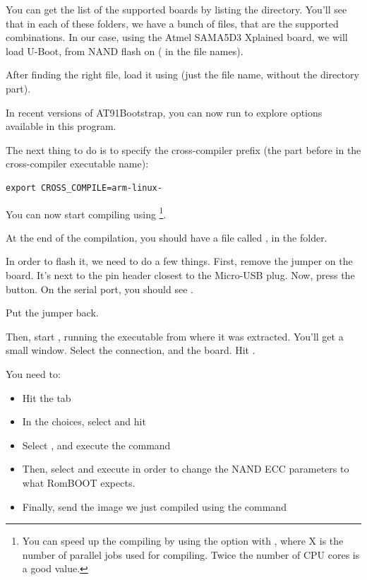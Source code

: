 You can get the list of the supported boards by listing the
 directory. You'll see that in each of these folders, we
have a bunch of  files, that are the supported
combinations. In our case, using the Atmel SAMA5D3 Xplained
board, we will load U-Boot, from NAND flash on
( in the  file names).

After finding the right  file, load it using
 (just the file name, without
the directory part).

In recent versions of AT91Bootstrap, you can now run  to explore options available in this program. 

The next thing to do is to specify the cross-compiler prefix
(the part before  in the cross-compiler executable name):

\begin{verbatim}
export CROSS_COMPILE=arm-linux-
\end{verbatim}

You can now start compiling using \footnote{You can
speed up the compiling by using the  option with
, where X is the number of parallel jobs used for
compiling. Twice the number of CPU cores is a good value.}.

At the end of the compilation, you should have a file called
, in the
 folder.

In order to flash it, we need to do a few things. First, remove the
 jumper on the board. It's next to the pin header
closest to the Micro-USB plug. Now, press the  button.
On the serial port, you should see .

Put the jumper back.

Then, start , running the executable from where
it was extracted. You'll get a small window. Select the 
connection, and the  board. Hit
.

You need to:
\begin{itemize}
\item Hit the  tab
\item In the  choices, select 
      and hit 
\item Select , and execute the command
\item Then, select and execute 
  in order to change the NAND ECC parameters to what RomBOOT expects.
\item Finally, send the image we just compiled using the command
\end{itemize}

